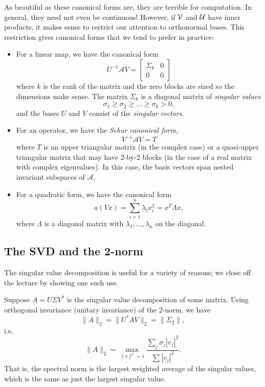 \documentclass[12pt, leqno]{article} %
\begin{document}
As beautiful as these canonical forms are, they are terrible for
computation.  In general, they need not even be continuous!
However, if $\cal{V}$ and $\cal{U}$ have inner products, it makes
sense to restrict our attention to orthonormal bases.  This
restriction gives canonical forms that we tend to prefer in practice:
\begin{itemize}
\item For a linear map, we have the canonical form
  \[
    U^{-1} \mathcal{A} V = \begin{bmatrix} \Sigma_k & 0 \\ 0 & 0 \end{bmatrix}
  \]
  where $k$ is the rank of the matrix and the zero blocks are sized
  so the dimensions make sense.  The matrix $\Sigma_k$ is a diagonal
  matrix of {\em singular values}
  \[
    \sigma_1 \geq \sigma_2 \geq \ldots \geq \sigma_k > 0,
  \]
  and the bases $U$ and $V$ consist of the {\em singular vectors}.  
\item For an operator, we have the {\em Schur canonical form},
  \[
    V^{-1} \mathcal{A} V = T
  \]
  where $T$ is an upper triangular matrix (in the complex case) or
  a quasi-upper triangular matrix that may have 2-by-2 blocks
  (in the case of a real matrix with complex eigenvalues).
  In this case, the basis vectors span nested invariant subspaces
  of $\mathcal{A}$.
\item For a quadratic form, we have the canonical form
  \[
    a(Vx) = \sum_{i=1}^{n} \lambda_i x_i^2 = x^T \Lambda x,
  \]
  where $\Lambda$ is a diagonal matrix with $\lambda_1, \ldots,
  \lambda_n$ on the diagonal.
\end{itemize}


\subsection{The SVD and the 2-norm}

The singular value decomposition is useful for a variety of reasons;
we close off the lecture by showing one such use.

Suppose $A = U \Sigma V^*$ is the singular value decomposition of some
matrix.  Using orthogonal invariance (unitary invariance) of the
2-norm, we have
\[
  \|A\|_2 = \|U^* A V\|_2 = \|\Sigma_2\|,
\]
i.e.~
\[
  \|A\|_2 = \max_{\|v\|^2 = 1} \frac{\sum_j \sigma_j |v_j|^2}{\sum |v_j|^2}.
\]
That is, the spectral norm is the largest weighted average of the
singular values, which is the same as just the largest singular value.
\end{document}
